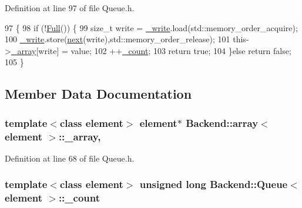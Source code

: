 Definition at line 97 of file Queue.\+h.


\begin{DoxyCode}
97                                         \{
98             \textcolor{keywordflow}{if} (!\hyperlink{classBackend_1_1Queue_acb0a8bd00d4708253e5d25465191dca1}{Full}()) \{
99                 \textcolor{keywordtype}{size\_t} write = \hyperlink{classBackend_1_1Queue_ab3d5c4738092cf356b36c56f6ab61554}{\_write}.load(std::memory\_order\_acquire);
100                 \hyperlink{classBackend_1_1Queue_ab3d5c4738092cf356b36c56f6ab61554}{\_write}.store(\hyperlink{classBackend_1_1Queue_a91b2f12926d36b547343a91790fe76bb}{next}(write),std::memory\_order\_release);
101                 this->\hyperlink{classBackend_1_1array_ac588c1e30c2c4748bc9a5bb12b9320af}{\_array}[write] = value;
102                 ++\hyperlink{classBackend_1_1Queue_ab49d17e24dc0f8a2e5e44c182c240249}{\_count};
103                 \textcolor{keywordflow}{return} \textcolor{keyword}{true};
104             \}\textcolor{keywordflow}{else} \textcolor{keywordflow}{return} \textcolor{keyword}{false};
105         \}
\end{DoxyCode}


\subsection{Member Data Documentation}
\hypertarget{classBackend_1_1array_ac588c1e30c2c4748bc9a5bb12b9320af}{
\subsubsection[{\+\_\+array}]{\setlength{\rightskip}{0pt plus 5cm}template$<$class element$>$ element$\ast$ {\bf Backend\+::array}$<$ element $>$\+::\+\_\+array\hspace{0.3cm}{\ttfamily [protected]}, {\ttfamily [inherited]}}}\label{classBackend_1_1array_ac588c1e30c2c4748bc9a5bb12b9320af}


Definition at line 68 of file Queue.\+h.

\hypertarget{classBackend_1_1Queue_ab49d17e24dc0f8a2e5e44c182c240249}{
\subsubsection[{\+\_\+count}]{\setlength{\rightskip}{0pt plus 5cm}template$<$class element$>$ unsigned long {\bf Backend\+::\+Queue}$<$ element $>$\+::\+\_\+count\hspace{0.3cm}{\ttfamily [protected]}}}\label{classBackend_1_1Queue_ab49d17e24dc0f8a2e5e44c182c240249}


